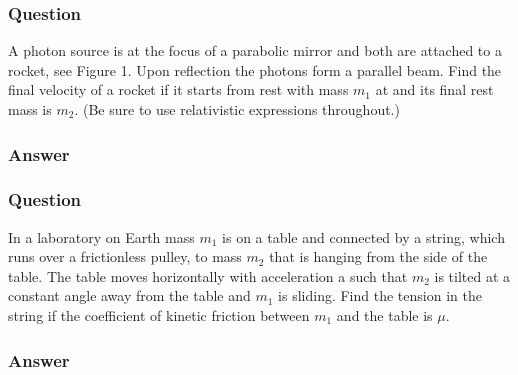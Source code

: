 \subsubsection{Question}
A photon source is at the focus of a parabolic mirror and both are attached to a rocket, see Figure 1. Upon reflection the photons form a parallel beam. Find the final velocity of a rocket if it starts from rest with mass $m_1$ at and its final rest mass is $m_2$. (Be sure to use relativistic expressions throughout.)
\subsubsection{Answer}


\subsubsection{Question}
In a laboratory on Earth mass $m_1$ is on a table and connected by a string, which runs over a frictionless pulley, to mass $m_2$ that is hanging from the side of the table. The table moves horizontally with acceleration a such that $m_2$ is tilted at a constant angle away from the table and $m_1$ is sliding. Find the tension in the string if the coefficient of kinetic friction between $m_1$ and the table is $\mu$.
\subsubsection{Answer}



